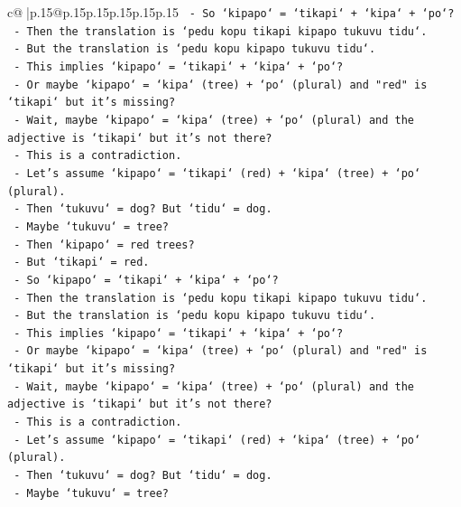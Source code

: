 \documentclass{article}
\begin{document}
{\begin{supertabular}{c@{$\;$}|p{.15\linewidth}@{}p{.15\linewidth}p{.15\linewidth}p{.15\linewidth}p{.15\linewidth}p{.15\linewidth}}
{{{\texttt{          {-} So `kipapo` = `tikapi` + `kipa` + `po`?} \\
\texttt{          {-} Then the translation is `pedu kopu tikapi kipapo tukuvu tidu`.} \\
\texttt{          {-} But the translation is `pedu kopu kipapo tukuvu tidu`.} \\
\texttt{          {-} This implies `kipapo` = `tikapi` + `kipa` + `po`?} \\
\texttt{          {-} Or maybe `kipapo` = `kipa` (tree) + `po` (plural) and "red" is `tikapi` but it's missing?} \\
\texttt{          {-} Wait, maybe `kipapo` = `kipa` (tree) + `po` (plural) and the adjective is `tikapi` but it's not there?} \\
\texttt{          {-} This is a contradiction.} \\
\texttt{          {-} Let's assume `kipapo` = `tikapi` (red) + `kipa` (tree) + `po` (plural).} \\
\texttt{          {-} Then `tukuvu` = dog? But `tidu` = dog.} \\
\texttt{          {-} Maybe `tukuvu` = tree?} \\
\texttt{          {-} Then `kipapo` = red trees?} \\
\texttt{          {-} But `tikapi` = red.} \\
\texttt{          {-} So `kipapo` = `tikapi` + `kipa` + `po`?} \\
\texttt{          {-} Then the translation is `pedu kopu tikapi kipapo tukuvu tidu`.} \\
\texttt{          {-} But the translation is `pedu kopu kipapo tukuvu tidu`.} \\
\texttt{          {-} This implies `kipapo` = `tikapi` + `kipa` + `po`?} \\
\texttt{          {-} Or maybe `kipapo` = `kipa` (tree) + `po` (plural) and "red" is `tikapi` but it's missing?} \\
\texttt{          {-} Wait, maybe `kipapo` = `kipa` (tree) + `po` (plural) and the adjective is `tikapi` but it's not there?} \\
\texttt{          {-} This is a contradiction.} \\
\texttt{          {-} Let's assume `kipapo` = `tikapi` (red) + `kipa` (tree) + `po` (plural).} \\
\texttt{          {-} Then `tukuvu` = dog? But `tidu` = dog.} \\
\texttt{          {-} Maybe `tukuvu` = tree?} \\
}}}
\end{supertabular}}
\end{document}
